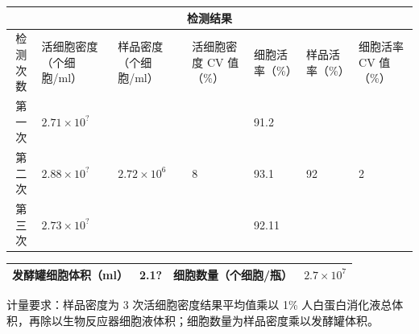 \documentclass[UTF8,10pt,a4paper,fontset=fandol]{ctexart}
\newcommand{\fieldvalue}[1]{#1}
\newcommand{\handwritten}[1]{#1}
\begin{document}
\begin{minipage}{\textwidth}
\begin{center}
\begin{tabularx}{\textwidth}{|c|X|X|X|X|X|X|}
\hline
\multicolumn{7}{|c|}{检测结果}\\
\hline
检测次数
&
活细胞密度（个细胞/ml）
&
样品密度（个细胞/ml）
&
活细胞密度 CV 值（\%）
&
细胞活率（\%）
&
样品活率（\%）
&
细胞活率 CV 值（\%）
\\
\hline
第一次
&
\fieldvalue{\handwritten{$2.71\times10^{?}$}}
&
&
&
\fieldvalue{\handwritten{91.2}}
&
&
\\
\hline
第二次
&
\fieldvalue{\handwritten{$2.88\times10^{?}$}}
&
\fieldvalue{\handwritten{$2.72\times10^{6}$}}
&
\fieldvalue{\handwritten{8}}
&
\fieldvalue{\handwritten{93.1}}
&
\fieldvalue{\handwritten{92}}
&
\fieldvalue{\handwritten{2}}
\\
\hline
第三次
&
\fieldvalue{\handwritten{$2.73\times10^{?}$}}
&
&
&
\fieldvalue{\handwritten{92.11}}
&
&
\\
\hline
\end{tabularx}
\end{center}

\begin{tabularx}{\textwidth}{|l|X|l|X|}
\hline
发酵罐细胞体积（ml）
&
\fieldvalue{\handwritten{2.1?}}
&
细胞数量（个细胞/瓶）
&
\fieldvalue{\handwritten{$2.7\times10^{7}$}}
\\
\hline
\end{tabularx}

计量要求：样品密度为 3 次活细胞密度结果平均值乘以 1\% 人白蛋白消化液总体积，再除以生物反应器细胞液体积；细胞数量为样品密度乘以发酵罐体积。


\end{minipage}
\end{document}
